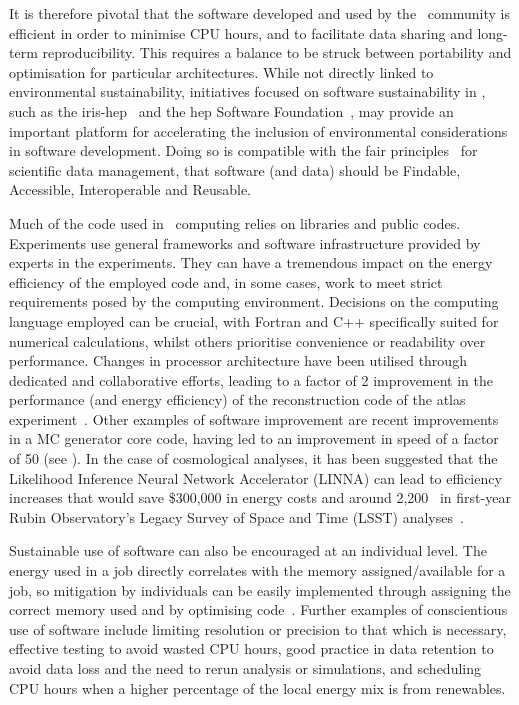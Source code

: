 \documentclass[../SustainableHEP.tex]{subfiles}
\begin{document}
It is therefore pivotal that the software developed and used by the \ACR\ community is efficient in order to minimise CPU hours, and to facilitate data sharing and long-term reproducibility. This requires a balance to be struck between portability and optimisation for particular architectures.  While not directly linked to environmental sustainability, initiatives focused on software sustainability in \ACR, such as the \acrshort{iris-hep}~\cite{IRISHEP} and the \acrshort{hep} Software Foundation~\cite{HSF}, may provide an important platform for accelerating the inclusion of  environmental considerations in software development. Doing so is compatible with the \acrshort{fair} principles~\cite{FAIR} for scientific data management, that software (and data) should be Findable, Accessible, Interoperable and Reusable.

Much of the code used in \ACR\ computing relies on libraries and public codes. Experiments use general frameworks and software infrastructure provided by experts in the experiments. They can have a tremendous impact on the energy efficiency of the employed code and, in some cases, work to meet strict requirements posed by the computing environment. Decisions on the computing language employed can be crucial, with Fortran and C++ specifically suited for numerical calculations, whilst others prioritise convenience or readability over performance.  Changes in processor architecture have been utilised through dedicated and collaborative  efforts, leading to a factor of 2 improvement in the performance (and energy efficiency) of the reconstruction code of the \acrshort{atlas} experiment~\cite{ATL-SOFT-PUB-2021-002}. Other examples of software improvement are recent improvements in a MC generator core code, having led to an improvement in speed of a factor of 50 (see ).  In the case of cosmological analyses, it has been suggested that the Likelihood Inference Neural Network Accelerator (LINNA) can lead to efficiency increases that would save  \$300,000 in energy costs and around 2,200 \tCdO\ in first-year Rubin Observatory's Legacy Survey of Space and Time (LSST) analyses~\cite{To:2022ubu}.

Sustainable use of software can also be encouraged at an individual level. The energy used in a job directly correlates with the memory assigned/available for a job, so mitigation by individuals can be easily implemented through assigning the correct memory used and by optimising code~\cite{Karayakin}. Further examples of conscientious use of software include limiting resolution or precision to that which is necessary, effective testing to avoid wasted CPU hours, good practice in data retention to avoid data loss and the need to rerun analysis or simulations, and scheduling CPU hours when a higher percentage of the local energy mix is from renewables.
\end{document}
